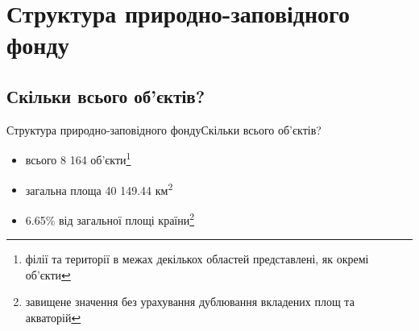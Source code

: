 \documentclass[12pt, aspectratio=1610]{beamer}
\begin{document}
\section{Структура природно-заповідного фонду}

\subsection{Скільки всього об'єктів?}
\begin{frame}{Структура природно-заповідного фонду}{Скільки всього об'єктів?}
	\begin{itemize}
		\item всього 8 164 об'єкти\footnote{філії та території в межах декількох областей представлені, як окремі об'єкти}
		\item загальна площа 40 149.44 км\textsuperscript{2}
		\item 6.65\% від загальної площі країни\footnote{завищене значення без урахування дублювання вкладених площ та акваторій}
	\end{itemize}
\end{frame}
\end{document}
